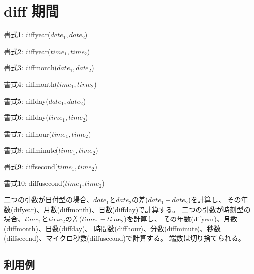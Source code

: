 
%

\section{diff 期間\label{sect:diff}}

書式1: diffyear($date_1,date_2$)

書式2: diffyear($time_1,time_2$)

書式3: diffmonth($date_1,date_2$)

書式4: diffmonth($time_1,time_2$)

書式5: diffday($date_1,date_2$)

書式6: diffday($time_1,time_2$)

書式7: diffhour($time_1,time_2$)

書式8: diffminute($time_1,time_2$)

書式9: diffsecond($time_1,time_2$)

書式10: diffusecond($time_1,time_2$)

二つの引数が日付型の場合、$date_1$と$date_2$の差($date_1-date_2$)を計算し、
その年数(difyear)、月数(diffmonth)、日数(diffday)で計算する。
二つの引数が時刻型の場合、$time_1$と$time_2$の差($time_1-time_2$)を計算し、
その年数(difyear)、月数(diffmonth)、日数(diffday)、
時間数(diffhour)、分数(diffminute)、秒数(diffsecond)、マイクロ秒数(diffusecond)で計算する。
端数は切り捨てられる。

\subsection*{利用例}


%

